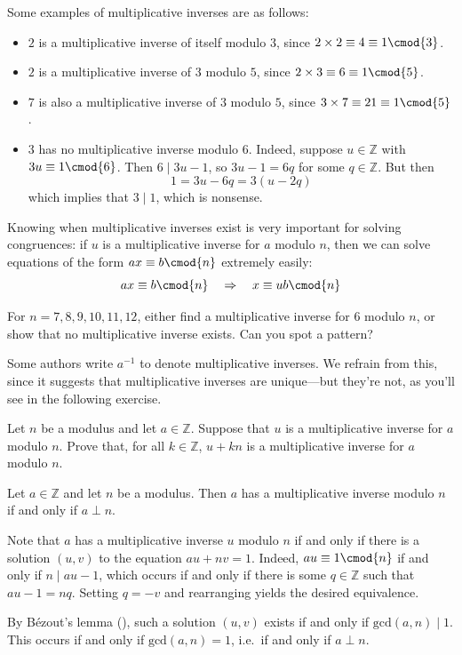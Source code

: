 \begin{example}
Some examples of multiplicative inverses are as follows:
\begin{itemize}
\item $2$ is a multiplicative inverse of itself modulo $3$, since $2 \times 2 \equiv 4 \equiv 1 \cmod{3}$.
\item $2$ is a multiplicative inverse of $3$ modulo $5$, since $2 \times 3 \equiv 6 \equiv 1 \cmod{5}$.
\item $7$ is also a multiplicative inverse of $3$ modulo $5$, since $3 \times 7 \equiv 21 \equiv 1 \cmod{5}$.
\item $3$ has no multiplicative inverse modulo $6$. Indeed, suppose $u \in \mathbb{Z}$ with $3u \equiv 1 \cmod{6}$. Then $6 \mid 3u-1$, so $3u-1 = 6q$ for some $q \in \mathbb{Z}$. But then
\[ 1 = 3u-6q = 3(u-2q) \]
which implies that $3 \mid 1$, which is nonsense.
\end{itemize}
\end{example}

Knowing when multiplicative inverses exist is very important for solving congruences: if $u$ is a multiplicative inverse for $a$ modulo $n$, then we can solve equations of the form $ax \equiv b \cmod{n}$ extremely easily:
\[ ax \equiv b \cmod{n} \quad \Rightarrow \quad x \equiv ub \cmod{n} \]

\begin{exercise}
For $n=7,8,9,10,11,12$, either find a multiplicative inverse for $6$ modulo $n$, or show that no multiplicative inverse exists. Can you spot a pattern?
\end{exercise}

Some authors write $a^{-1}$ to denote multiplicative inverses. We refrain from this, since it suggests that multiplicative inverses are unique---but they're not, as you'll see in the following exercise.

\begin{exercise}
Let $n$ be a modulus and let $a \in \mathbb{Z}$. Suppose that $u$ is a multiplicative inverse for $a$ modulo $n$. Prove that, for all $k \in \mathbb{Z}$, $u+kn$ is a multiplicative inverse for $a$ modulo $n$.
\end{exercise}

\begin{proposition} \label{propMultInvExistence}
Let $a \in \mathbb{Z}$ and let $n$ be a modulus. Then $a$ has a multiplicative inverse modulo $n$ if and only if $a \perp n$.
\end{proposition}
\begin{cproof}
Note that $a$ has a multiplicative inverse $u$ modulo $n$ if and only if there is a solution $(u,v)$ to the equation $au+nv=1$. Indeed, $au \equiv 1 \cmod{n}$ if and only if $n \mid au-1$, which occurs if and only if there is some $q \in \mathbb{Z}$ such that $au-1=nq$. Setting $q=-v$ and rearranging yields the desired equivalence.

By B\'{e}zout's lemma (), such a solution $(u,v)$ exists if and only if $\mathrm{gcd}(a,n) \mid 1$. This occurs if and only if $\mathrm{gcd}(a,n) = 1$, i.e.\ if and only if $a \perp n$.
\end{cproof}

